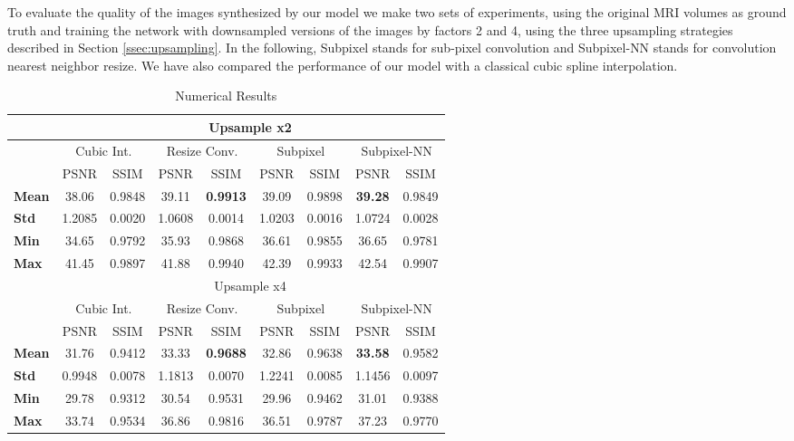 \documentclass{article}
\begin{document}
To evaluate the quality of the images synthesized by our model we make two sets of experiments, using the original MRI volumes as ground truth and training the network with downsampled versions of the images by factors 2 and 4, using the three upsampling strategies described in Section \ref{ssec:upsampling}. In the following, Subpixel stands for sub-pixel convolution and Subpixel-NN stands for convolution nearest neighbor resize. We have also compared the performance of our model with a classical cubic spline interpolation.

  

\begin{table}[h]
\centering
\begin{tabular}{ l@{}c c c c c c c c }
\hline
&\multicolumn{8}{c}{Upsample x2}\\
\hline
&\multicolumn{2}{c}{Cubic Int.} &
 \multicolumn{2}{c}{Resize Conv.} &
 \multicolumn{2}{c}{Subpixel} &
 \multicolumn{2}{c}{Subpixel-NN} \\
\hline 
& PSNR & SSIM & PSNR & SSIM & PSNR & SSIM & PSNR & SSIM  \\
\hline
\textbf{Mean } & 38.06 & 0.9848 & 39.11 & \textbf{0.9913} & 39.09 & 0.9898 & \textbf{39.28} & 0.9849\\
\textbf{Std} & 1.2085 & 0.0020 & 1.0608 & 0.0014 & 1.0203 & 0.0016 & 1.0724 & 0.0028\\
\textbf{Min} & 34.65 & 0.9792 & 35.93 & 0.9868 & 36.61 & 0.9855 & 36.65 & 0.9781\\
\textbf{Max} & 41.45 & 0.9897 & 41.88 & 0.9940 & 42.39 & 0.9933 & 42.54 & 0.9907\\
\hline
&\multicolumn{8}{c}{Upsample x4}\\
\hline
&\multicolumn{2}{c}{Cubic Int.} &
 \multicolumn{2}{c}{Resize Conv.} &
 \multicolumn{2}{c}{Subpixel} &
 \multicolumn{2}{c}{Subpixel-NN} \\
\hline 
& PSNR & SSIM & PSNR & SSIM & PSNR & SSIM & PSNR & SSIM  \\
\hline
 \textbf{Mean } & 31.76 & 0.9412 & 33.33 & \textbf{0.9688} & 32.86 & 0.9638 & \textbf{33.58} & 0.9582\\
 \textbf{Std} & 0.9948 & 0.0078 & 1.1813 & 0.0070 & 1.2241 & 0.0085 & 1.1456 & 0.0097 \\
 \textbf{Min} & 29.78 & 0.9312 & 30.54 & 0.9531 & 29.96 & 0.9462 & 31.01 & 0.9388\\
 \textbf{Max} & 33.74 & 0.9534 & 36.86 & 0.9816 & 36.51 & 0.9787 & 37.23 & 0.9770\\

\hline 
\end{tabular}
\caption{Numerical Results}
\label{tab:results_performance}
\end{table}
\end{document}
